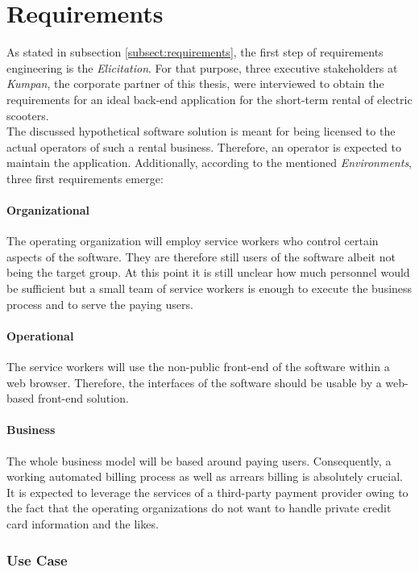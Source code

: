 \documentclass[12pt,a4paper]{report}
\begin{document}
\section{Requirements} \label{subsect:hypothetical-requirements}

As stated in subsection \ref{subsect:requirements}, the first step of
requirements engineering is the \textit{Elicitation}.
For that purpose, three executive stakeholders
at \textit{Kumpan}, the corporate partner of this thesis, were interviewed
to obtain the requirements for an ideal back-end application for the
short-term rental of electric scooters.\\
The discussed hypothetical software solution is meant for being licensed to
the actual operators of such a rental business. Therefore, an operator
is expected to maintain the application. Additionally, according to the
mentioned \textit{Environments}, three first requirements emerge:

\paragraph{Organizational}
The operating organization will employ service workers who
control certain aspects of the software. They are therefore still users of the
software albeit not being the target group. At this point it is still unclear
how much personnel would be sufficient but a small team of service workers is
enough to execute the business process and to serve the paying users.

\paragraph{Operational}
The service workers will use the non-public front-end of the software within a
web browser. Therefore, the interfaces of the software should be usable by
a web-based front-end solution.

\paragraph{Business}
The whole business model will be based around paying users. Consequently,
a working automated billing process as well as arrears billing is absolutely
crucial. It is expected to leverage the services of a third-party payment
provider owing to the fact that the operating organizations do not want to
handle private credit card information and the likes.


\subsubsection{Use Case}
\end{document}
